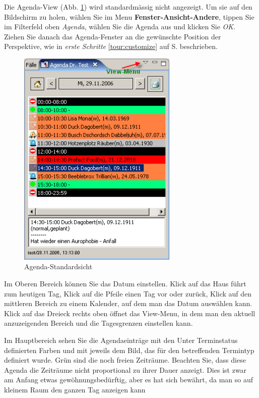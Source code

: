 Die Agenda-View (Abb. \ref{fig:agenda1}) wird standardmässig nicht angezeigt. Um sie auf den Bildschirm zu holen, wählen Sie im Menu
 \textbf{Fenster-Ansicht-Andere}, tippen Sie im Filterfeld oben \textit{Agenda}, wählen Sie die Agenda aus und
 klicken Sie \textit{OK}. Ziehen Sie danach das Agenda-Fenster an die gewünschte Position der Perspektive, wie in \textit{erste Schritte} \ref{tour:customize} auf S. \pageref{tour:customize} beschrieben. 
\begin{figure}
\includegraphics[width=3in]{images/use2.png}
\caption{Agenda-Standardsicht}\label{fig:agenda1}
\end{figure}
Im Oberen Bereich können Sie das Datum einstellen. Klick auf das Haus führt zum heutigen Tag, Klick auf die Pfeile einen Tag vor oder
zurück, Klick auf den mittleren Bereich zu einem Kalender, auf dem man das Datum auswählen kann.
Klick auf das Dreieck rechts oben öffnet das View-Menu, in dem man den aktuell anzuzeigenden Bereich und die Tagesgrenzen einstellen kann.

Im Hauptbereich sehen Sie die Agendaeinträge mit den Unter Terminstatus definierten Farben und mit jeweils dem Bild, das für den betreffenden Termintyp definiert wurde. Grün sind die noch freien  Zeiträume. Beachten Sie, dass diese Agenda die Zeiträume nicht proportional zu ihrer Dauer anzeigt. Dies ist zwar am Anfang etwas gewöhnungsbedürftig, aber es hat sich bewährt, da man so auf kleinem Raum den ganzen Tag anzeigen kann

\medskip 

